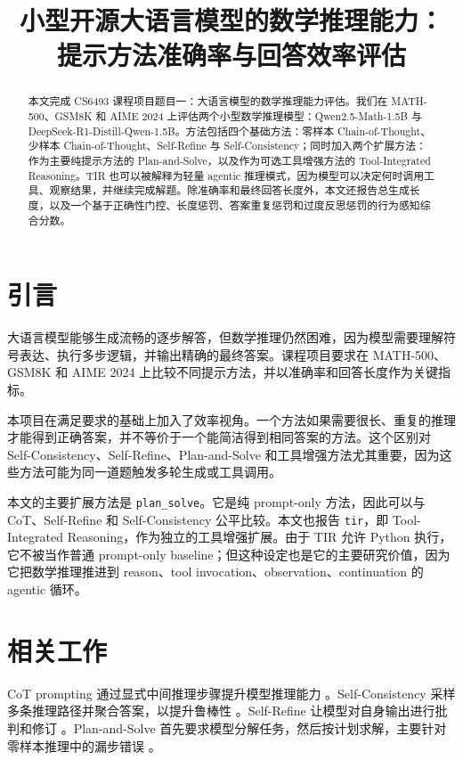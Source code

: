 \documentclass[conference]{IEEEtran}
\newcommand{\qwen}{Qwen2.5-Math-1.5B}
\newcommand{\deepseek}{DeepSeek-R1-Distill-Qwen-1.5B}
\newcommand{\mathfive}{MATH-500}
\begin{document}
\title{小型开源大语言模型的数学推理能力：\\提示方法准确率与回答效率评估}

\author{
}

\maketitle

\begin{abstract}
本文完成 CS6493 课程项目题目一：大语言模型的数学推理能力评估。我们在 \mathfive{}、GSM8K 和 AIME 2024 上评估两个小型数学推理模型：\qwen{} 与 \deepseek{}。方法包括四个基础方法：零样本 Chain-of-Thought、少样本 Chain-of-Thought、Self-Refine 与 Self-Consistency；同时加入两个扩展方法：作为主要纯提示方法的 Plan-and-Solve，以及作为可选工具增强方法的 Tool-Integrated Reasoning。TIR 也可以被解释为轻量 agentic 推理模式，因为模型可以决定何时调用工具、观察结果，并继续完成解题。除准确率和最终回答长度外，本文还报告总生成长度，以及一个基于正确性门控、长度惩罚、答案重复惩罚和过度反思惩罚的行为感知综合分数。
\end{abstract}

\section{引言}
大语言模型能够生成流畅的逐步解答，但数学推理仍然困难，因为模型需要理解符号表达、执行多步逻辑，并输出精确的最终答案。课程项目要求在 \mathfive{}、GSM8K 和 AIME 2024 上比较不同提示方法，并以准确率和回答长度作为关键指标。

本项目在满足要求的基础上加入了效率视角。一个方法如果需要很长、重复的推理才能得到正确答案，并不等价于一个能简洁得到相同答案的方法。这个区别对 Self-Consistency、Self-Refine、Plan-and-Solve 和工具增强方法尤其重要，因为这些方法可能为同一道题触发多轮生成或工具调用。

本文的主要扩展方法是 \texttt{plan\_solve}。它是纯 prompt-only 方法，因此可以与 CoT、Self-Refine 和 Self-Consistency 公平比较。本文也报告 \texttt{tir}，即 Tool-Integrated Reasoning，作为独立的工具增强扩展。由于 TIR 允许 Python 执行，它不被当作普通 prompt-only baseline；但这种设定也是它的主要研究价值，因为它把数学推理推进到 reason、tool invocation、observation、continuation 的 agentic 循环。

\section{相关工作}
CoT prompting 通过显式中间推理步骤提升模型推理能力 \cite{wei2022cot}。Self-Consistency 采样多条推理路径并聚合答案，以提升鲁棒性 \cite{wang2022selfconsistency}。Self-Refine 让模型对自身输出进行批判和修订 \cite{madaan2024selfrefine}。Plan-and-Solve 首先要求模型分解任务，然后按计划求解，主要针对零样本推理中的漏步错误 \cite{wang2023plansolve}。
\end{document}
